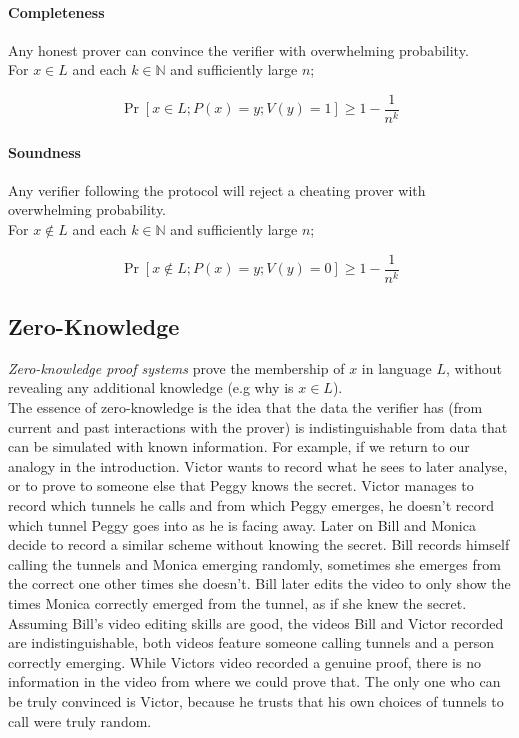 \paragraph{Completeness}

Any honest prover can convince the verifier with overwhelming probability.\\
For $x \in L$ and each $k \in \mathbb{N}$ and sufficiently large $n$;

$$\Pr[x \in L; P(x) = y; V(y) = 1] \ge 1 - \frac{1}{n^k}$$

\paragraph{Soundness}

Any verifier following the protocol will reject a cheating prover with overwhelming probability.\\
For $x \notin L$ and each $k \in \mathbb{N}$ and sufficiently large $n$;

$$\Pr[x \notin L; P(x) = y; V(y) = 0] \ge 1 - \frac{1}{n^k}$$

\subsection{Zero-Knowledge}

\textit{Zero-knowledge proof systems} prove the  membership of $x$ in language $L$, without revealing any additional knowledge (e.g why is $x \in L$).\\
The essence of zero-knowledge is the idea that the data the verifier has (from current and past interactions with the prover) is indistinguishable from data that can be simulated with known information.
For example, if we return to our analogy in the introduction. 
Victor wants to record what he sees to later analyse, or to prove to someone else that Peggy knows the secret.
Victor manages to record which tunnels he calls and from which Peggy emerges, he doesn't record which tunnel Peggy goes into as he is facing away.
Later on Bill and Monica decide to record a similar scheme without knowing the secret.
Bill records himself calling the tunnels and Monica emerging randomly, sometimes she emerges from the correct one other times she doesn't. 
Bill later edits the video to only show the times Monica correctly emerged from the tunnel, as if she knew the secret.
Assuming Bill's video editing skills are good, the videos Bill and Victor recorded are indistinguishable, both videos feature someone calling tunnels and a person correctly emerging. 
While Victors video recorded a genuine proof, there is no information in the video from where we could prove that.
The only one who can be truly convinced is Victor, because he trusts that his own choices of tunnels to call were truly random.

